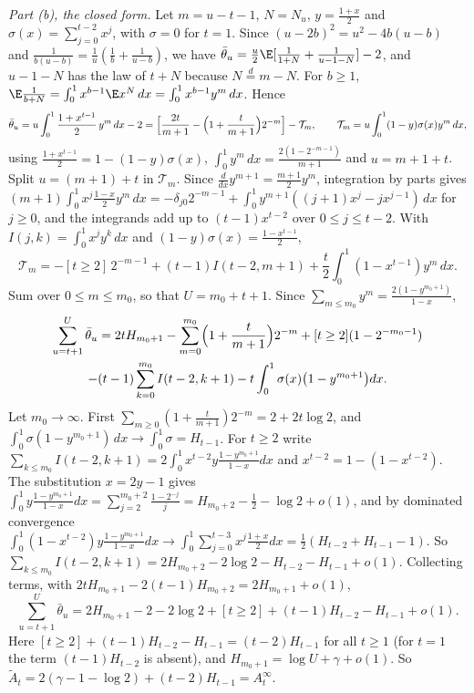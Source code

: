 \emph{Part (b), the closed form.} Let $m=u-t-1$, $N=N_u$, $y=\frac{1+x}2$
and $\sigma(x)=\sum_{j=0}^{t-2}x^j$, with $\sigma=0$ for $t=1$. Since
$(u-2b)^2=u^2-4b(u-b)$ and $\frac1{b(u-b)}=\frac1u(\frac1b+\frac1{u-b})$,
we have $\bar\theta_u=\frac u2\E[\frac1{1+N}+\frac1{u-1-N}]-2$, and
$u-1-N$ has the law of $t+N$ because $N\overset d=m-N$. For $b\ge1$,
$\E\frac1{b+N}=\int_0^1x^{b-1}\E x^N\,dx=\int_0^1x^{b-1}y^m\,dx$. Hence
\[
 \bar\theta_u=u\int_0^1\frac{1+x^{t-1}}2\,y^m\,dx-2
 =\Bigl[\frac{2t}{m+1}-\Bigl(1+\frac t{m+1}\Bigr)2^{-m}\Bigr]-\mathcal T_m,
 \qquad\mathcal T_m=u\int_0^1(1-y)\sigma(x)y^m\,dx,
\]
using $\frac{1+x^{t-1}}2=1-(1-y)\sigma(x)$,
$\int_0^1y^m\,dx=\frac{2(1-2^{-m-1})}{m+1}$ and $u=m+1+t$. Split
$u=(m+1)+t$ in $\mathcal T_m$. Since $\frac d{dx}y^{m+1}=\frac{m+1}2y^m$,
integration by parts gives
$(m+1)\int_0^1x^j\frac{1-x}2y^m\,dx=-\delta_{j0}2^{-m-1}
+\int_0^1y^{m+1}((j+1)x^j-jx^{j-1})\,dx$ for $j\ge0$, and the integrands add
up to $(t-1)x^{t-2}$ over $0\le j\le t-2$. With
$I(j,k)=\int_0^1x^jy^k\,dx$ and $(1-y)\sigma(x)=\frac{1-x^{t-1}}2$,
\[
 \mathcal T_m=-[t\ge2]\,2^{-m-1}+(t-1)I(t-2,m+1)
 +\frac t2\int_0^1(1-x^{t-1})y^m\,dx .
\]
Sum over $0\le m\le m_0$, so that $U=m_0+t+1$. Since
$\sum_{m\le m_0}y^m=\frac{2(1-y^{m_0+1})}{1-x}$,
\begin{multline*}
 \sum_{u=t+1}^U\bar\theta_u=2tH_{m_0+1}
 -\sum_{m=0}^{m_0}\Bigl(1+\frac t{m+1}\Bigr)2^{-m}+[t\ge2](1-2^{-m_0-1})\\
 -(t-1)\sum_{k=0}^{m_0}I(t-2,k+1)-t\int_0^1\sigma(x)\bigl(1-y^{m_0+1}\bigr)dx .
\end{multline*}
Let $m_0\to\infty$. First $\sum_{m\ge0}(1+\frac t{m+1})2^{-m}=2+2t\log2$,
and $\int_0^1\sigma(1-y^{m_0+1})\,dx\to\int_0^1\sigma=H_{t-1}$. For
$t\ge2$ write $\sum_{k\le m_0}I(t-2,k+1)
=2\int_0^1x^{t-2}y\frac{1-y^{m_0+1}}{1-x}dx$ and
$x^{t-2}=1-(1-x^{t-2})$. The substitution $x=2y-1$ gives
$\int_0^1y\frac{1-y^{m_0+1}}{1-x}dx=\sum_{j=2}^{m_0+2}\frac{1-2^{-j}}j
=H_{m_0+2}-\frac12-\log2+o(1)$, and by dominated convergence
$\int_0^1(1-x^{t-2})y\frac{1-y^{m_0+1}}{1-x}dx\to
\int_0^1\sum_{j=0}^{t-3}x^j\frac{1+x}2dx=\frac12(H_{t-2}+H_{t-1}-1)$. So
$\sum_{k\le m_0}I(t-2,k+1)=2H_{m_0+2}-2\log2-H_{t-2}-H_{t-1}+o(1)$.
Collecting terms, with $2tH_{m_0+1}-2(t-1)H_{m_0+2}=2H_{m_0+1}+o(1)$,
\[
 \sum_{u=t+1}^U\bar\theta_u=2H_{m_0+1}-2-2\log2+[t\ge2]+(t-1)H_{t-2}-H_{t-1}+o(1).
\]
Here $[t\ge2]+(t-1)H_{t-2}-H_{t-1}=(t-2)H_{t-1}$ for all $t\ge1$ (for
$t=1$ the term $(t-1)H_{t-2}$ is absent), and
$H_{m_0+1}=\log U+\gamma+o(1)$. So
$\tilde A_t=2(\gamma-1-\log2)+(t-2)H_{t-1}=A^\infty_t$.

